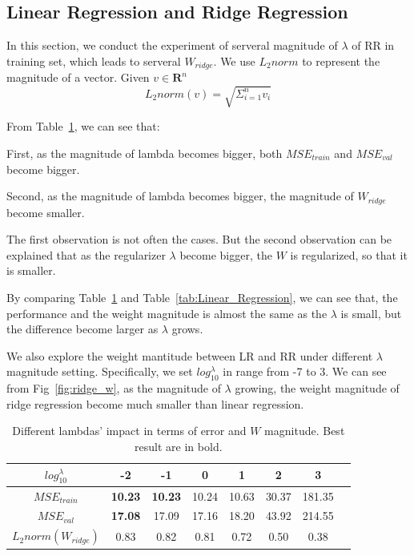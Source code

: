 \documentclass[journal, a4paper]{IEEEtran}
\begin{document}
\subsection{Linear Regression and Ridge Regression}
In this section, we conduct the experiment of serveral magnitude of $\lambda$ of RR in training set, which leads to serveral $W_{ridge}$. We use $L_2{norm}$ to represent the magnitude of a vector. Given $v \in \mathbf{R}^{n}$
\begin{equation}
	L_2norm(v) = \sqrt{\Sigma_{i=1}^{n} v_{i}}
\end{equation} \par
From Table~\ref{tab:Ridge_Regression}, we can see that: \par
First, as the magnitude of lambda becomes bigger, both $MSE_{train}$ and $MSE_{val}$ become bigger. \par
Second, as the magnitude of lambda becomes bigger, the magnitude of $W_{ridge}$ become smaller. \par
The first observation is not often the cases. But the second observation can be explained that as the regularizer $\lambda$ become bigger, the $W$ is regularized, so that it is smaller. \par
By comparing Table~\ref{tab:Ridge_Regression} and Table~\ref{tab:Linear_Regression}, we can see that, the performance and the weight magnitude is almost the same as the $\lambda$ is small, but the difference become larger as $\lambda$ grows. \par
We also explore the weight mantitude between LR and RR under different $\lambda$ magnitude setting. Specifically, we set $log_{10}^{\lambda}$ in range from -7 to 3. We can see from Fig~\ref{fig:ridge_w}, as the magnitude of $\lambda$ growing, the weight magnitude of ridge regression become much smaller than linear regression. \par
\begin{table}[!hbt]
	\begin{center}
		\caption{Different lambdas' impact in terms of error and $W$ magnitude. Best result are in bold.}
		\label{tab:Ridge_Regression}
		\begin{tabular}{|c|c|c|c|c|c|c|c|}
			\hline
			$log_{10}^{\lambda}$ & -2 & -1 & 0 & 1 & 2 & 3 \\
			\hline
			$MSE_{train}$   & \textbf{10.23} & \textbf{10.23} & 10.24 & 10.63 & 30.37 & 181.35   \\
			\hline
			$MSE_{val}$  & \textbf{17.08} & 17.09 & 17.16 & 18.20 & 43.92 & 214.55   \\
			\hline
			$L_2norm(W_{ridge})$  & 0.83 & 0.82 & 0.81 & 0.72 & 0.50 & 0.38 \\
			\hline
		\end{tabular}
	\end{center}
\end{table}
\end{document}
